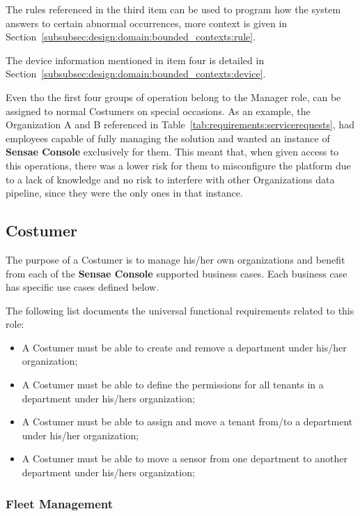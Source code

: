 The rules referenced in the third item can be used to program how the system answers to certain abnormal occurrences, more context is given in Section~\ref{subsubsec:design:domain:bounded_contexts:rule}.

The device information mentioned in item four is detailed in Section~\ref{subsubsec:design:domain:bounded_contexts:device}.

Even tho the first four groups of operation belong to the Manager role, can be assigned to normal Costumers on special occasions. As an example, the Organization A and B referenced in Table~\ref{tab:requirements:servicerequests}, had employees capable of fully managing the solution and wanted an instance of \textbf{Sensae Console} exclusively for them. This meant that, when given access to this operations, there was a lower risk for them to misconfigure the platform due to a lack of knowledge and no risk to interfere with other Organizations data pipeline, since they were the only ones in that instance.

\subsection{Costumer}
\label{subsec:requirements:functional:costumer}

The purpose of a Costumer is to manage his/her own organizations and benefit from each of the \textbf{Sensae Console} supported business cases. Each business case has specific use cases defined below.

The following list documents the universal functional requirements related to this role:

\begin{itemize}
    \item A Costumer must be able to create and remove a department under his/her organization;
    \item A Costumer must be able to define the permissions for all tenants in a department under his/hers organization;
    \item A Costumer must be able to assign and move a tenant from/to a department under his/her organization;
    \item A Costumer must be able to move a sensor from one department to another department under his/hers organization;
\end{itemize}

\subsubsection*{Fleet Management}
\label{subsubsec:requirements:functional:costumer:fleet}

